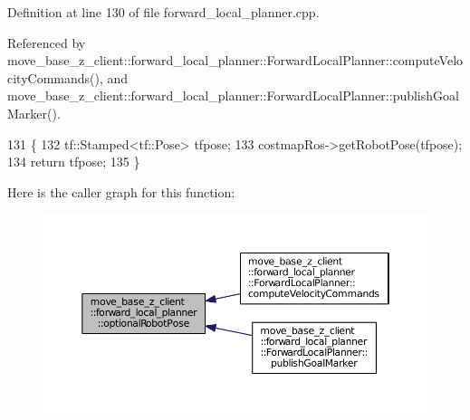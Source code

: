 Definition at line 130 of file forward\+\_\+local\+\_\+planner.\+cpp.



Referenced by move\+\_\+base\+\_\+z\+\_\+client\+::forward\+\_\+local\+\_\+planner\+::\+Forward\+Local\+Planner\+::compute\+Velocity\+Commands(), and move\+\_\+base\+\_\+z\+\_\+client\+::forward\+\_\+local\+\_\+planner\+::\+Forward\+Local\+Planner\+::publish\+Goal\+Marker().


\begin{DoxyCode}
131 \{
132     tf::Stamped<tf::Pose> tfpose;
133     costmapRos->getRobotPose(tfpose);
134     \textcolor{keywordflow}{return} tfpose;
135 \}
\end{DoxyCode}


Here is the caller graph for this function\+:
\nopagebreak
\begin{figure}[H]
\begin{center}
\leavevmode
\includegraphics[width=350pt]{namespacemove__base__z__client_1_1forward__local__planner_a683a39a154ed5aa179fdb1afb7bfe2e4_icgraph}
\end{center}
\end{figure}


